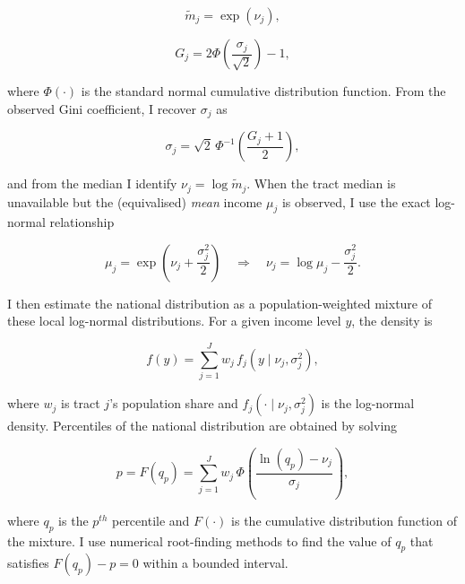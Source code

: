 \begin{equation}
\tilde m_j = \exp(\nu_j),
\end{equation}

\begin{equation}
G_j = 2\Phi\left(\frac{\sigma_j}{\sqrt{2}}\right) - 1,
\end{equation}

where $\Phi(\cdot)$ is the standard normal cumulative distribution function. From the observed Gini coefficient, I recover $\sigma_j$ as

\begin{equation}
\sigma_j = \sqrt{2}\,\Phi^{-1}\!\left(\frac{G_j + 1}{2}\right),
\end{equation}

and from the median I identify $\nu_j=\log \tilde m_j$. When the tract median is unavailable but the (equivalised) \emph{mean} income $\mu_j$ is observed, I use the exact log-normal relationship

\begin{equation}
\mu_j = \exp\!\left(\nu_j + \frac{\sigma_j^2}{2}\right)
\quad\Rightarrow\quad
\nu_j = \log \mu_j - \frac{\sigma_j^2}{2}.
\end{equation}

I then estimate the national distribution as a population-weighted mixture of these local log-normal distributions. For a given income level $y$, the density is

\begin{equation}
f(y) = \sum_{j=1}^{J} w_j\, f_j(y \mid \nu_j,\sigma_j^2),
\end{equation}

where $w_j$ is tract $j$'s population share and $f_j(\cdot \mid \nu_j,\sigma_j^2)$ is the log-normal density. Percentiles of the national distribution are obtained by solving

\begin{equation}
p = F(q_p) = \sum_{j=1}^{J} w_j \,\Phi\!\left(\frac{\ln(q_p) - \nu_j}{\sigma_j}\right),
\end{equation}

where $q_p$ is the $p^{th}$ percentile and $F(\cdot)$ is the cumulative distribution function of the mixture. I use numerical root-finding methods to find the value of $q_p$ that satisfies $F(q_p) - p = 0$ within a bounded interval.


